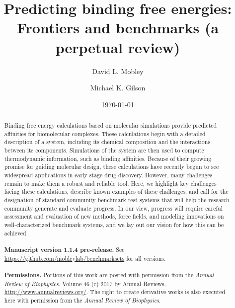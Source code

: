 \documentclass[aps,pre,twocolumn,nofootinbib,superscriptaddress,10pt, final,tightenlines]{revtex4-1}
\begin{document}
\title{Predicting binding free energies: Frontiers and benchmarks (a perpetual review)}

\author{David L. Mobley}
\author{Michael K. Gilson}


\date{\today}

\begin{abstract}
Binding free energy calculations based on molecular simulations provide predicted affinities for biomolecular complexes. 
These calculations begin with a detailed description of a system, including its chemical composition and the interactions between its components. 
Simulations of the system are then used to compute thermodynamic information, such as binding affinities. 
Because of their growing promise for guiding molecular design, these calculations have recently begun to see widespread applications in early stage drug discovery.
However, many challenges remain to make them a robust and reliable tool. 
Here, we highlight key challenges facing these calculations, describe known examples of these challenges, and call for the designation of standard community benchmark  test systems that will help the research community generate and evaluate progress.
In our view, progress will require careful assessment and evaluation of new methods, force fields, and modeling innovations on well-characterized benchmark systems, and we lay out our vision for how this can be achieved.
\\
\\
{\bf Manuscript version 1.1.4 pre-release.} See \url{https://github.com/mobleylab/benchmarksets} for all versions.
\\
\\
{{\bf Permissions.} Portions of this work are posted with permission from the \emph{Annual Review of Biophysics}, Volume 46 (c) 2017 by Annual Reviews, \url{http://www.annualreviews.org/}. 
The right to create derivative works is also executed here with permission from the \emph{Annual Review of Biophysics}.}

\end{abstract}
\end{document}

